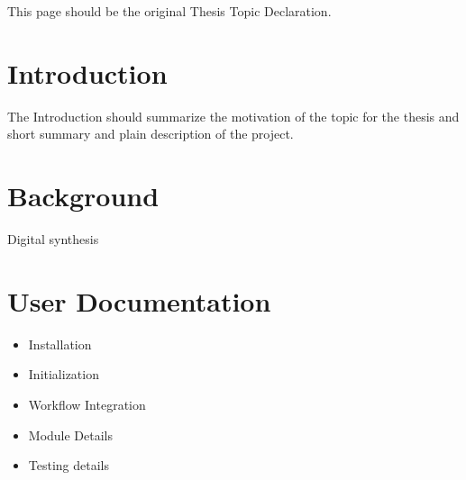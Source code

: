 \documentclass[a4paper,12pt]{report}
\begin{document}




\vspace*{\fill}
\begin{center}
This page should be the original Thesis Topic Declaration.
\end{center}
\vfill
\thispagestyle{empty}
\newpage
\setcounter{page}{1}


\tableofcontents



\chapter{Introduction}

The Introduction should summarize the motivation of the topic for the thesis and short summary and plain description of the project.



\chapter{Background}
Digital synthesis

\chapter{User Documentation}


\begin{itemize}
    \item Installation
    \item Initialization
    \item Workflow Integration
    \item Module Details
    \item Testing details
\end{itemize}
\end{document}

